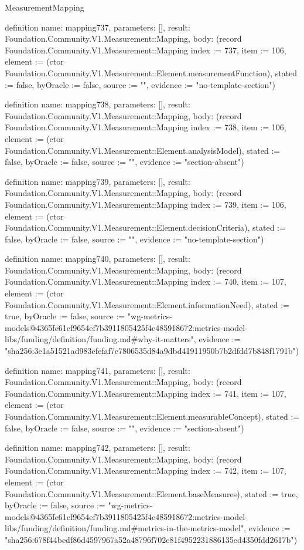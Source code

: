 \begin{lexlean}{MeasurementMapping}
\begin{semanticmodule}
definition{
  name: mapping737,
  parameters: [],
  result: Foundation.Community.V1.Measurement::Mapping,
  body: (record Foundation.Community.V1.Measurement::Mapping {index := 737, item := 106, element := (ctor Foundation.Community.V1.Measurement::Element.measurementFunction), stated := false, byOracle := false, source := "", evidence := "no-template-section"})
}

definition{
  name: mapping738,
  parameters: [],
  result: Foundation.Community.V1.Measurement::Mapping,
  body: (record Foundation.Community.V1.Measurement::Mapping {index := 738, item := 106, element := (ctor Foundation.Community.V1.Measurement::Element.analysisModel), stated := false, byOracle := false, source := "", evidence := "section-absent"})
}

definition{
  name: mapping739,
  parameters: [],
  result: Foundation.Community.V1.Measurement::Mapping,
  body: (record Foundation.Community.V1.Measurement::Mapping {index := 739, item := 106, element := (ctor Foundation.Community.V1.Measurement::Element.decisionCriteria), stated := false, byOracle := false, source := "", evidence := "no-template-section"})
}

definition{
  name: mapping740,
  parameters: [],
  result: Foundation.Community.V1.Measurement::Mapping,
  body: (record Foundation.Community.V1.Measurement::Mapping {index := 740, item := 107, element := (ctor Foundation.Community.V1.Measurement::Element.informationNeed), stated := true, byOracle := false, source := "wg-metrics-models@4365fe61cf9654ef7b3911805425f4e485918672:metrics-model-libs/funding/definition/funding.md#why-it-matters", evidence := "sha256:3e1a51521ad983efefaf7e7806535d84a9dbd41911950b7b2dfdd7b848f1791b"})
}

definition{
  name: mapping741,
  parameters: [],
  result: Foundation.Community.V1.Measurement::Mapping,
  body: (record Foundation.Community.V1.Measurement::Mapping {index := 741, item := 107, element := (ctor Foundation.Community.V1.Measurement::Element.measurableConcept), stated := false, byOracle := false, source := "", evidence := "section-absent"})
}

definition{
  name: mapping742,
  parameters: [],
  result: Foundation.Community.V1.Measurement::Mapping,
  body: (record Foundation.Community.V1.Measurement::Mapping {index := 742, item := 107, element := (ctor Foundation.Community.V1.Measurement::Element.baseMeasures), stated := true, byOracle := false, source := "wg-metrics-models@4365fe61cf9654ef7b3911805425f4e485918672:metrics-model-libs/funding/definition/funding.md#metrics-in-the-metrics-model", evidence := "sha256:678f44bedf86d4597967a52a48796f702e81f4952231886135ed4350fdd2617b"})
}


\end{semanticmodule}
\end{lexlean}
